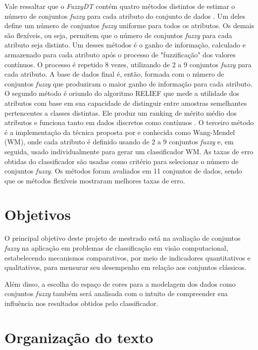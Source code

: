 Vale ressaltar que o \emph{FuzzyDT} contém quatro métodos distintos de estimar o número de conjuntos \emph{fuzzy} para cada atributo do conjunto de dados \citep{cintra:11}. Um deles define um número de conjuntos \emph{fuzzy} uniforme para todos os atributos. Os demais são flexíveis, ou seja, permitem que o número de conjuntos \emph{fuzzy} para cada atributo seja distinto. Um desses métodos é o ganho de informação, calculado e armazenado para cada atributo após o processo de "fuzzificação" dos valores contínuos. O processo é repetido 8 vezes, utilizando de 2 a 9 conjuntos \emph{fuzzy} para cada atributo. A base de dados final é, então, formada com o número de conjuntos \emph{fuzzy} que produziram o maior ganho de informação para cada atributo. O segundo método é oriundo do algoritmo RELIEF que mede a utilidade dos atributos com base em sua capacidade de distinguir entre amostras semelhantes pertencentes a classes distintas. Ele produz um ranking de mérito médio dos atributos e funciona tanto em dados discretos como contínuos \citep{kononenko:94}. O terceiro método é a implementação da técnica proposta por \citet{wang:03} e conhecida como Wang-Mendel (WM), onde cada atributo é definido usando de 2 a 9 conjuntos \emph{fuzzy} e, em seguida, usado individualmente para gerar um classificador WM. As taxas de erro obtidas do classificador são usadas como critério para selecionar o número de conjuntos \emph{fuzzy}. Os métodos foram avaliados em 11 conjuntos de dados, sendo que os métodos flexíveis mostraram melhores taxas de erro.


\section{Objetivos}
\label{sec:objetivo}

O principal objetivo deste projeto de mestrado está na avaliação de conjuntos \emph{fuzzy} na aplicação em problemas de classificação em visão computacional, estabelecendo mecanismos comparativos, por meio de indicadores quantitativos e qualitativos, para mensurar seu desempenho em relação aos conjuntos clássicos.

Além disso, a escolha do espaço de cores para a modelagem dos dados como conjuntos \emph{fuzzy} também será analisada com o intuito de compreender sua influência nos resultados obtidos pelo classificador.


\section{Organização do texto}
\label{sec:organizacao_trabalho}

